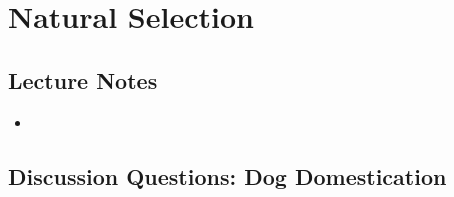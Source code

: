 \documentclass[12pt,a4paper]{article}
\begin{document}
\clearpage
\setcounter{section}{2}
\section{Natural Selection}
\subsection{Lecture Notes}
\begin{itemize}
    \item 
\end{itemize}

\subsection{Discussion Questions: Dog Domestication}
\end{document}
